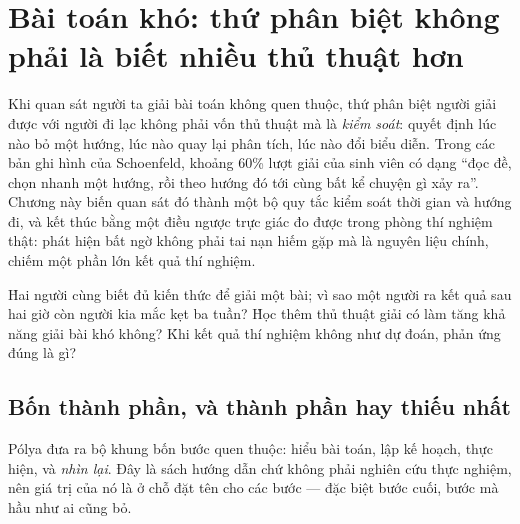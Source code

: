 \documentclass[../hieu-suat.tex]{subfiles}
\begin{document}
\chapter{Bài toán khó: thứ phân biệt không phải là biết nhiều thủ thuật hơn}

\begin{tomtat}
Khi quan sát người ta giải bài toán không quen thuộc, thứ phân biệt người giải được với người đi lạc không phải vốn thủ thuật mà là \emph{kiểm soát}: quyết định lúc nào bỏ một hướng, lúc nào quay lại phân tích, lúc nào đổi biểu diễn. Trong các bản ghi hình của Schoenfeld, khoảng 60\% lượt giải của sinh viên có dạng ``đọc đề, chọn nhanh một hướng, rồi theo hướng đó tới cùng bất kể chuyện gì xảy ra''. Chương này biến quan sát đó thành một bộ quy tắc kiểm soát thời gian và hướng đi, và kết thúc bằng một điều ngược trực giác đo được trong phòng thí nghiệm thật: phát hiện bất ngờ không phải tai nạn hiếm gặp mà là nguyên liệu chính, chiếm một phần lớn kết quả thí nghiệm.
\end{tomtat}

\begin{nentang}
\end{nentang}

\begin{khoigoi}
\h{Hai người cùng biết đủ kiến thức để giải một bài; vì sao một người ra kết quả sau hai giờ còn người kia mắc kẹt ba tuần?}
\h{Học thêm thủ thuật giải có làm tăng khả năng giải bài khó không?}
\h{Khi kết quả thí nghiệm không như dự đoán, phản ứng đúng là gì?}
\end{khoigoi}

\section{Bốn thành phần, và thành phần hay thiếu nhất}

Pólya \cite{polya1945} đưa ra bộ khung bốn bước quen thuộc: hiểu bài toán, lập kế hoạch, thực hiện, và \emph{nhìn lại}. Đây là sách hướng dẫn chứ không phải nghiên cứu thực nghiệm, nên giá trị của nó là ở chỗ đặt tên cho các bước --- đặc biệt bước cuối, bước mà hầu như ai cũng bỏ.
\end{document}
